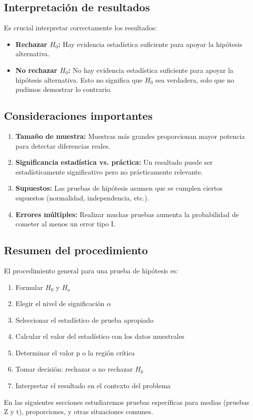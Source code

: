 \subsection{Interpretación de resultados}

Es crucial interpretar correctamente los resultados:

\begin{itemize}
	\item \textbf{Rechazar $H_0$:} Hay evidencia estadística suficiente para apoyar la hipótesis alternativa.

	\item \textbf{No rechazar $H_0$:} No hay evidencia estadística suficiente para apoyar la hipótesis alternativa. Esto no significa que $H_0$ sea verdadera, solo que no pudimos demostrar lo contrario.
\end{itemize}

\subsection{Consideraciones importantes}

\begin{enumerate}
	\item \textbf{Tamaño de muestra:} Muestras más grandes proporcionan mayor potencia para detectar diferencias reales.

	\item \textbf{Significancia estadística vs. práctica:} Un resultado puede ser estadísticamente significativo pero no prácticamente relevante.

	\item \textbf{Supuestos:} Las pruebas de hipótesis asumen que se cumplen ciertos supuestos (normalidad, independencia, etc.).

	\item \textbf{Errores múltiples:} Realizar muchas pruebas aumenta la probabilidad de cometer al menos un error tipo I.
\end{enumerate}

\subsection{Resumen del procedimiento}

El procedimiento general para una prueba de hipótesis es:

\begin{enumerate}
	\item Formular $H_0$ y $H_a$
	\item Elegir el nivel de significación $\alpha$
	\item Seleccionar el estadístico de prueba apropiado
	\item Calcular el valor del estadístico con los datos muestrales
	\item Determinar el valor p o la región crítica
	\item Tomar decisión: rechazar o no rechazar $H_0$
	\item Interpretar el resultado en el contexto del problema
\end{enumerate}

En las siguientes secciones estudiaremos pruebas específicas para medias (pruebas Z y t), proporciones, y otras situaciones comunes.
